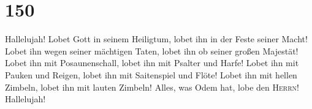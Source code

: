 \hypertarget{section-149}{%
\section{150}\label{section-149}}

 Hallelujah! Lobet Gott in seinem Heiligtum, lobet ihn in
der Feste seiner Macht!  Lobet ihn wegen seiner mächtigen
Taten, lobet ihn ob seiner großen Majestät!  Lobet ihn mit
Posaunenschall, lobet ihn mit Psalter und Harfe!  Lobet
ihn mit Pauken und Reigen, lobet ihn mit Saitenspiel und Flöte!
 Lobet ihn mit hellen Zimbeln, lobet ihn mit lauten
Zimbeln!  Alles, was Odem hat, lobe den \textsc{Herrn}!
Hallelujah!
